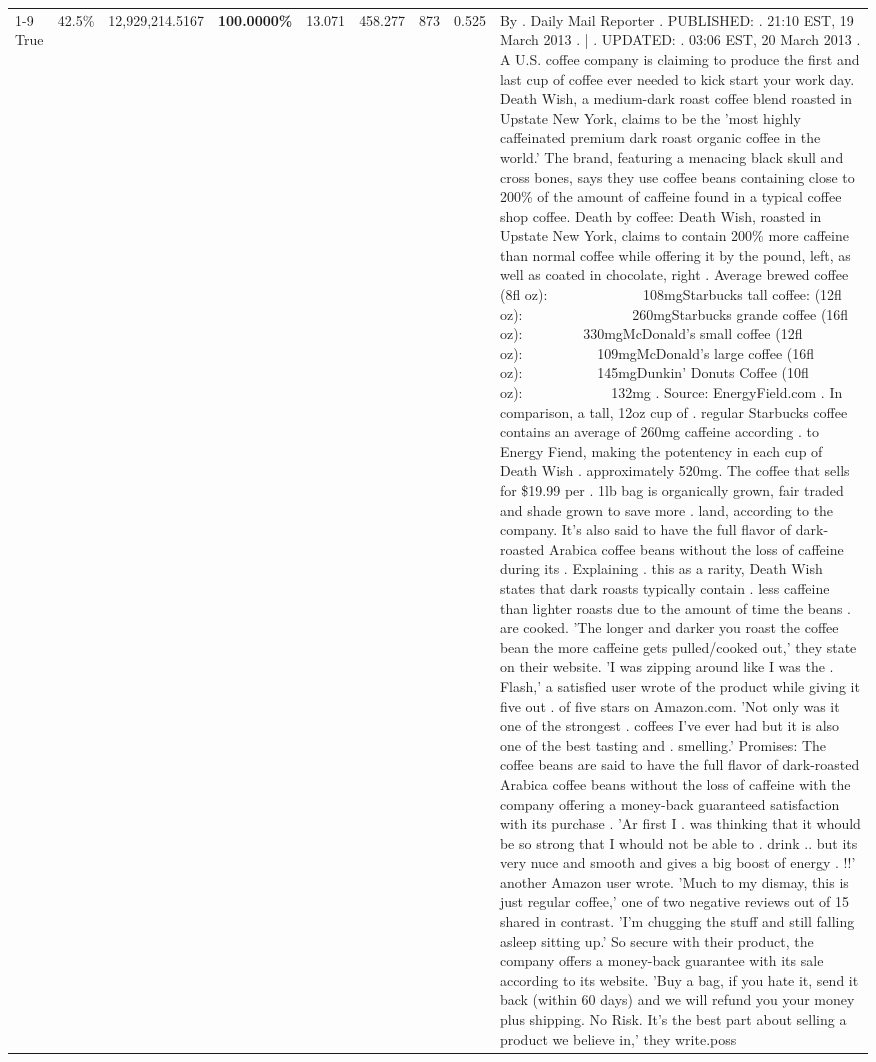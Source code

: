 \begin{table}[H]
{\begin{tabular}{lllrlllll}
\cline{1-9}
True & 42.5\% & 12,929,214.5167 & \bfseries \color{red} 100.0000\% & 13.071 & 458.277 & 873 & 0.525 & By . Daily Mail Reporter . PUBLISHED: . 21:10 EST, 19 March 2013 . | . UPDATED: . 03:06 EST, 20 March 2013 . A U.S. coffee company is claiming to produce the first and last cup of coffee ever needed to kick start your work day. Death Wish, a medium-dark roast coffee blend roasted in Upstate New York, claims to be the 'most highly caffeinated premium dark roast organic coffee in the world.' The brand, featuring a menacing black skull and cross bones, says they use coffee beans containing close to 200\% of the amount of caffeine found in a typical coffee shop coffee. Death by coffee: Death Wish, roasted in Upstate New York, claims to contain 200\% more caffeine than normal coffee while offering it by the pound, left, as well as coated in chocolate, right . Average brewed coffee (8fl oz):              108mgStarbucks tall coffee: (12fl oz):                260mgStarbucks grande coffee (16fl oz):         330mgMcDonald's small coffee (12fl oz):           109mgMcDonald's large coffee (16fl oz):           145mgDunkin' Donuts Coffee (10fl oz):             132mg . Source: EnergyField.com . In comparison, a tall, 12oz cup of . regular Starbucks coffee contains an average of 260mg caffeine according . to Energy Fiend, making the potentency in each cup of Death Wish . approximately 520mg. The coffee that sells for \$19.99 per . 1lb bag is organically grown, fair traded and shade grown to save more . land, according to the company. It's also said to have the full flavor of dark-roasted Arabica coffee beans without the loss of caffeine during its . Explaining . this as a rarity, Death Wish states that dark roasts typically contain . less caffeine than lighter roasts due to the amount of time the beans . are cooked. 'The longer and darker you roast the coffee bean the more caffeine gets pulled/cooked out,' they state on their website. 'I was zipping around like I was the . Flash,' a satisfied user wrote of the product while giving it five out . of five stars on Amazon.com. 'Not only was it one of the strongest . coffees I've ever had but it is also one of the best tasting and . smelling.’ Promises: The coffee beans are said to have the full flavor of dark-roasted Arabica coffee beans without the loss of caffeine with the company offering a money-back guaranteed satisfaction with its purchase . 'Ar first I . was thinking that it whould be so strong that I whould not be able to . drink .. but its very nuce and smooth and gives a big boost of energy . !!' another Amazon user wrote. 'Much to my dismay, this is just regular coffee,' one of two negative reviews out of 15 shared in contrast. 'I'm chugging the stuff and still falling asleep sitting up.' So secure with their product, the company offers a money-back guarantee with its sale according to its website. 'Buy a bag, if you hate it, send it back (within 60 days) and we will refund you your money plus shipping. No Risk. It’s the best part about selling a product we believe in,' they write.poss \\

\end{tabular}}
\end{table}
